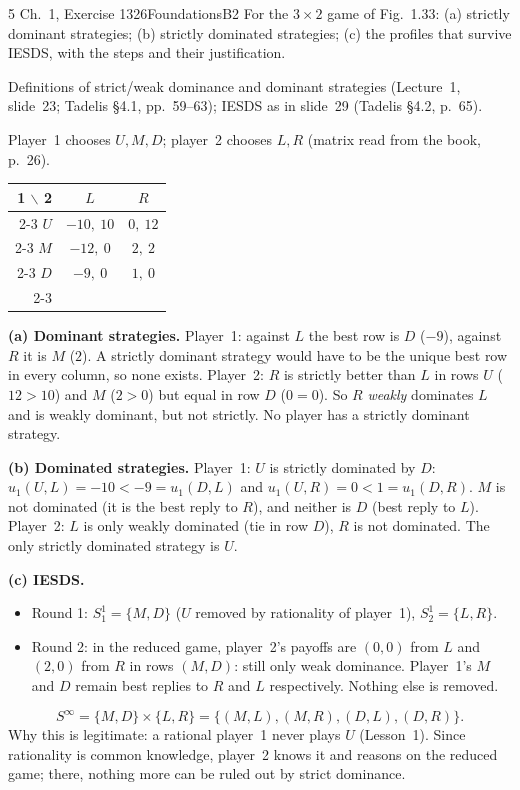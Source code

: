 \begin{exsol}{5}{\MG{} Ch.~1, Exercise 13}{26}{Foundations}{B2}
\asked For the $3 \times 2$ game of Fig.~1.33: (a) strictly dominant strategies; (b) strictly
dominated strategies; (c) the profiles that survive IESDS, with the steps and their
justification.

\method Definitions of strict/weak dominance and dominant strategies (Lecture~1, slide~23;
Tadelis \S4.1, pp.~59--63); IESDS as in slide~29 (Tadelis \S4.2, p.~65).

\solution
Player~1 chooses $U, M, D$; player~2 chooses $L, R$ (matrix read from the book, p.~26).
\begin{center}
\begin{tabular}{r|c|c|}
\multicolumn{1}{r}{1 $\backslash$ 2} & \multicolumn{1}{c}{$L$} & \multicolumn{1}{c}{$R$}\\ \cline{2-3}
$U$ & $-10,\ 10$ & $0,\ 12$ \\ \cline{2-3}
$M$ & $-12,\ 0$ & $2,\ 2$ \\ \cline{2-3}
$D$ & $-9,\ 0$ & $1,\ 0$ \\ \cline{2-3}
\end{tabular}
\end{center}

\textbf{(a) Dominant strategies.} Player~1: against $L$ the best row is $D$ ($-9$), against $R$
it is $M$ ($2$). A strictly dominant strategy would have to be the unique best row in every
column, so none exists. Player~2: $R$ is strictly better than $L$ in rows $U$ ($12 > 10$) and
$M$ ($2 > 0$) but equal in row $D$ ($0 = 0$). So $R$ \emph{weakly} dominates $L$ and is weakly
dominant, but not strictly. No player has a strictly dominant strategy.

\textbf{(b) Dominated strategies.} Player~1: $U$ is strictly dominated by $D$:
$u_1(U,L) = -10 < -9 = u_1(D,L)$ and $u_1(U,R) = 0 < 1 = u_1(D,R)$. $M$ is not dominated (it
is the best reply to $R$), and neither is $D$ (best reply to $L$). Player~2: $L$ is only weakly
dominated (tie in row $D$), $R$ is not dominated. The only strictly dominated strategy is $U$.

\textbf{(c) IESDS.}
\begin{itemize}
  \item Round 1: $S_1^1 = \{M, D\}$ ($U$ removed by rationality of player~1), $S_2^1 = \{L, R\}$.
  \item Round 2: in the reduced game, player~2's payoffs are $(0, 0)$ from $L$ and $(2, 0)$ from
  $R$ in rows $(M, D)$: still only weak dominance. Player~1's $M$ and $D$ remain best replies to
  $R$ and $L$ respectively. Nothing else is removed.
\end{itemize}
\[
  S^\infty = \{M, D\} \times \{L, R\} = \{(M,L), (M,R), (D,L), (D,R)\}.
\]
Why this is legitimate: a rational player~1 never plays $U$ (Lesson~1). Since rationality is
common knowledge, player~2 knows it and reasons on the reduced game; there, nothing more can be
ruled out by strict dominance.


\end{exsol}
